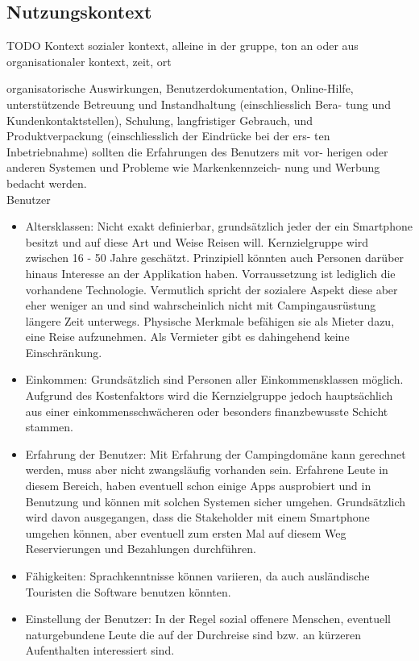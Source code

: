 
\subsection{Nutzungskontext}
TODO
 Kontext sozialer kontext, alleine in der gruppe, ton an oder aus
 organisationaler kontext, zeit, ort

organisatorische Auswirkungen, Benutzerdokumentation, Online-Hilfe, unterstützende Betreuung und Instandhaltung (einschliesslich Bera- tung und Kundenkontaktstellen), Schulung, langfristiger Gebrauch, und Produktverpackung (einschliesslich der Eindrücke bei der ers- ten Inbetriebnahme) sollten die Erfahrungen des Benutzers mit vor- herigen oder anderen Systemen und Probleme wie Markenkennzeich- nung und Werbung bedacht werden.\\
Benutzer
\begin{itemize}
   \item 
   Altersklassen: Nicht exakt definierbar, grundsätzlich jeder der ein Smartphone besitzt und auf diese Art und Weise Reisen will. Kernzielgruppe wird zwischen 16 - 50 Jahre geschätzt. Prinzipiell könnten auch Personen darüber hinaus Interesse an der Applikation haben. Vorraussetzung ist lediglich die vorhandene Technologie. Vermutlich spricht der sozialere Aspekt diese aber eher weniger an und sind wahrscheinlich nicht mit Campingausrüstung längere Zeit unterwegs. Physische Merkmale befähigen sie als Mieter dazu, eine Reise aufzunehmen. Als Vermieter gibt es dahingehend keine Einschränkung.

   \item 
   Einkommen: Grundsätzlich sind Personen aller Einkommensklassen möglich. Aufgrund des Kostenfaktors wird die Kernzielgruppe jedoch hauptsächlich aus einer einkommensschwächeren oder besonders finanzbewusste Schicht stammen.

   \item 
   Erfahrung der Benutzer: Mit Erfahrung der Campingdomäne kann gerechnet werden, muss aber nicht zwangsläufig vorhanden sein.
   Erfahrene Leute in diesem Bereich, haben eventuell schon einige Apps ausprobiert und in Benutzung und können mit solchen Systemen sicher umgehen.
   Grundsätzlich wird davon ausgegangen, dass die Stakeholder mit einem Smartphone umgehen können, aber eventuell zum ersten Mal auf diesem Weg Reservierungen und Bezahlungen durchführen. 

   \item
   Fähigkeiten: Sprachkenntnisse können variieren, da auch ausländische Touristen die Software benutzen könnten.

   \item 
   Einstellung der Benutzer: In der Regel sozial offenere Menschen, eventuell naturgebundene Leute die auf der Durchreise sind bzw. an kürzeren Aufenthalten interessiert sind. 

   
\end{itemize}

